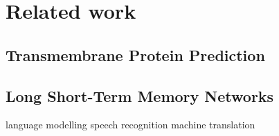 \section{Related work}
\subsection{Transmembrane Protein Prediction}
% 



\subsection{Long Short-Term Memory Networks}


language modelling \cite{JozefowiczEtAl, ShazeerEtAl}
speech recognition \cite{XiongEtAl}
machine translation \cite{WuEtAl}